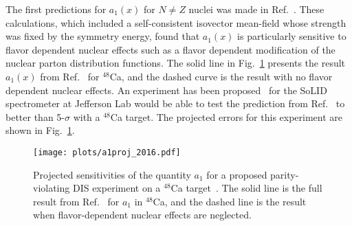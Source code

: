 The first predictions for $a_1(x)$ for $N \neq Z$ nuclei was made in Ref.~\cite{Cloet:2012td}. These calculations, which included a self-consistent isovector mean-field whose strength was fixed by the symmetry energy, found that $a_1(x)$ is particularly sensitive to flavor dependent nuclear effects such as a flavor dependent modification of the nuclear parton distribution functions. The solid line in Fig.~\ref{fig:ivemc:pvdis} presents the result $a_1(x)$ from Ref.~\cite{Cloet:2012td} for ${}^{48}$Ca, and the dashed curve is the result with no flavor dependent nuclear effects. An experiment has been proposed~\cite{emcpvdis} for the SoLID spectrometer at Jefferson Lab would be able to test the prediction from Ref.~\cite{Cloet:2012td} to better than 5-$\sigma$ with a ${}^{48}$Ca target. The projected errors for this experiment are shown in Fig.~\ref{fig:ivemc:pvdis}.

\begin{figure}[tbp]
\centering\texttt{[image: plots/a1proj\_2016.pdf]}
\caption{Projected sensitivities of the quantity $a_1$ for a proposed parity-violating DIS experiment on a ${}^{48}$Ca target~\cite{emcpvdis}. The solid line is the full result from Ref.~\cite{Cloet:2012td} for $a_1$ in ${}^{48}$Ca, and the dashed line is the result when flavor-dependent nuclear effects are neglected.}
\label{fig:ivemc:pvdis}
\end{figure}





